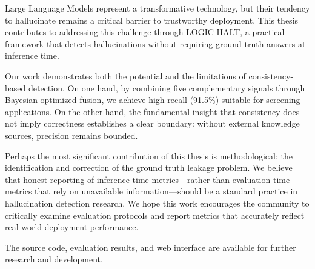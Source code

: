 Large Language Models represent a transformative technology, but their tendency to hallucinate remains a critical barrier to trustworthy deployment. This thesis contributes to addressing this challenge through LOGIC-HALT, a practical framework that detects hallucinations without requiring ground-truth answers at inference time.

Our work demonstrates both the potential and the limitations of consistency-based detection. On one hand, by combining five complementary signals through Bayesian-optimized fusion, we achieve high recall (91.5\%) suitable for screening applications. On the other hand, the fundamental insight that consistency does not imply correctness establishes a clear boundary: without external knowledge sources, precision remains bounded.

Perhaps the most significant contribution of this thesis is methodological: the identification and correction of the ground truth leakage problem. We believe that honest reporting of inference-time metrics---rather than evaluation-time metrics that rely on unavailable information---should be a standard practice in hallucination detection research. We hope this work encourages the community to critically examine evaluation protocols and report metrics that accurately reflect real-world deployment performance.

The source code, evaluation results, and web interface are available for further research and development.

